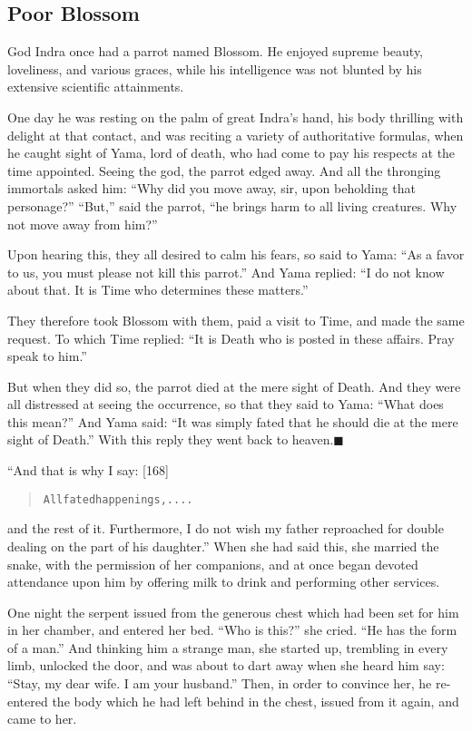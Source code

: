 \documentclass[article, twoside, 14pt]{memoir}
\newcommand{\qed}{\hfill \ensuremath{\blacksquare}}
\renewenvironment{verbatim}{%
\begin{quote}%
\vskip -10pt%
\begin{alltt}\normalfont\large}{\end{alltt}%
\end{quote}%
\vskip -10pt
} %
\begin{document}
\subsection{Poor Blossom}

God Indra once had a parrot named Blossom. He enjoyed supreme
beauty, loveliness, and various graces, while his intelligence was
not blunted by his extensive scientific attainments.

One day he was resting on the palm of great Indra's hand, his body
thrilling with delight at that contact, and was reciting a variety
of authoritative formulas, when he caught sight of Yama, lord of
death, who had come to pay his respects at the time appointed.
Seeing the god, the parrot edged away. And all the thronging
immortals asked him:
``Why did you move away, sir, upon beholding that personage?''
``But,'' said the parrot,
``he brings harm to all living creatures. Why not move away from him?''

Upon hearing this, they all desired to calm his fears, so said to
Yama: ``As a favor to us, you must please not kill this parrot.''
And Yama replied:
``I do not know about that. It is Time who determines these matters.''

They therefore took Blossom with them, paid a visit to Time, and
made the same request. To which Time replied:
``It is Death who is posted in these affairs. Pray speak to him.''

But when they did so, the parrot died at the mere sight of Death.
And they were all distressed at seeing the occurrence, so that they
said to Yama: ``What does this mean?'' And Yama said:
``It was simply fated that he should die at the mere sight of Death.''
With this reply they went back to heaven.\hyperref[s27]{\qed}

“And that is why I say: [168]

\begin{verbatim}
All fated happenings, ....
\end{verbatim}
and the rest of it. Furthermore, I do not wish my father reproached
for double dealing on the part of his daughter.” When she had said
this, she married the snake, with the permission of her companions,
and at once began devoted attendance upon him by offering milk to
drink and performing other services.

One night the serpent issued from the generous chest which had been
set for him in her chamber, and entered her bed. ``Who is this?''
she cried. ``He has the form of a man.'' And thinking him a strange
man, she started up, trembling in every limb, unlocked the door,
and was about to dart away when she heard him say:
``Stay, my dear wife. I am your husband.'' Then, in order to
convince her, he re-entered the body which he had left behind in
the chest, issued from it again, and came to her.
\end{document}
